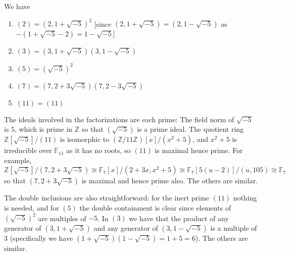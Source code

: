 \documentclass[11pt]{article}
\begin{document}
\begin{enumerate}
\begin{enumerate}
        We have \begin{enumerate}
            \item $(2) = (2,1+\sqrt{-5})^2$ [since $(2,1+\sqrt{-5}) = (2,1-\sqrt{-5})$ as $-(1+\sqrt{-5}-2)=1-\sqrt{-5}$]
            \item $(3) = (3,1+\sqrt{-5})(3,1-\sqrt{-5})$
            \item $(5)=(\sqrt{-5})^2$
            \item $(7) = (7,2+3\sqrt{-5})(7,2-3\sqrt{-5})$
            \item $(11) = (11)$
        \end{enumerate}
        The ideals involved in the factorizations are each prime: The field norm of $\sqrt{-5}$ is $5$, which is prime in $\mathbb{Z}$ so that $(\sqrt{-5})$ is a prime ideal. The quotient ring $\mathbb{Z}[\sqrt{-5}]/(11)$ is isomorphic to $(\mathbb{Z}/11\mathbb{Z})[x]/(x^2+5)$, and $x^2+5$ is irreducible over $\mathbb{F}_{11}$ as it has no roots, so $(11)$ is maximal hence prime. For example, $\mathbb{Z}[\sqrt{-5}]/(7,2+3\sqrt{-5})\cong \mathbb{F}_7[x]/(2+3x,x^2+5)\cong \mathbb{F}_7[5(u-2)]/(u,105)\cong \mathbb{F}_7$ so that $(7,2+3\sqrt{-5})$ is maximal and hence prime also. The others are similar.

        The double inclusions are also straightforward: for the inert prime $(11)$ nothing is needed, and for $(5)$ the double containment is clear since elements of $(\sqrt{-5})^2$ are multiples of $-5$. In $(3)$ we have that the product of any generator of $(3,1+\sqrt{-5})$ and any generator of $(3,1-\sqrt{-5})$ is a multiple of $3$ (specifically we have $(1+\sqrt{-5})(1-\sqrt{-5}) = 1+5=6$). The others are similar.
    \end{enumerate}
\end{enumerate}
\end{document}
